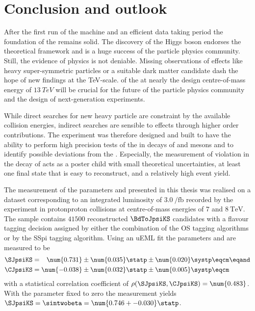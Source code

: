 
\chapter{Conclusion and outlook}
\label{ch:conclusion}

After the first run of the \LHC machine and an efficient data taking period the
foundation of the \SM remains solid. The discovery of the Higgs boson
\cite{Aad:2015zhl} endorses the theoretical framework and is a huge success of
the particle physics community. Still, the evidence of \BSM physics is not
deniable. Missing observations of \BSM effects like heavy super-symmetric
particles or a suitable dark matter candidate dash the hope of new findings at
the \si{TeV}-scale. \RunTwo of the \LHC at nearly the design centre-of-mass
energy of $\SI{13}{TeV}$ will be crucial for the future of the particle physics
community and the design of next-generation experiments.

While direct searches for new heavy particle are constraint by the available
collision energies, indirect searches are sensible to \BSM effects through
higher order contributions. The \LHCb experiment was therefore designed and
built to have the ability to perform high precision tests of the \SM in decays
of \B and \D mesons and to identify possible deviations from the \SM.
Especially, the measurement of \CP violation in the decay of \BdToJpsiKS acts as
a poster child with small theoretical uncertainties, at least one final state
that is easy to reconstruct, and a relatively high event yield.

The measurement of the \CP parameters \SJpsiKS and \CJpsiKS presented in this
thesis was realised on a dataset corresponding to an integrated luminosity of
$\SI{3.0}{\per\femto\barn}$ recorded by the \LHCb experiment in
\acl{protonproton} collisions at centre-of-mass energies of $\num{7}$ and
$\SI{8}{\TeV}$. The sample contains $\num{41500}$ reconstructed $\BdToJpsiKS$
candidates with a flavour tagging decision assigned by either the combination of
the \acl{OS} tagging algorithms or by the \acl{SSpi} tagging algorithm. Using an
\acl{uEML} fit the \CP parameters \SJpsiKS and \CJpsiKS are measured to be
%
\begin{equation*}
  \begin{split}
    \SJpsiKS &= \phantom{-}\num{0.731} \pm \num{0.035} \statp \pm \num{0.020} \systp \eqcm\eqand \\
    \CJpsiKS &=           \num{-0.038} \pm \num{0.032} \statp \pm \num{0.005} \systp \eqcm
  \end{split}
\end{equation*}
%
with a statistical correlation coefficient of $\rho(\SJpsiKS,\CJpsiKS) =
\num{0.483}$. With the parameter \CJpsiKS fixed to zero the measurement yields
$\SJpsiKS = \sintwobeta = \num{0.746 +- 0.030}\statp$.

